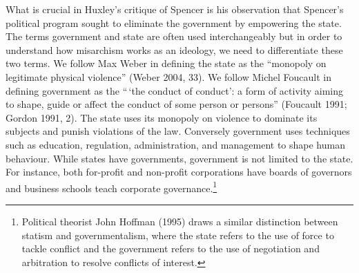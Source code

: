 \documentclass[12pt,]{article}
\begin{document}
What is crucial in Huxley's critique of Spencer is his observation that
Spencer's political program sought to eliminate the government by
empowering the state. The terms government and state are often used
interchangeably but in order to understand how misarchism works as an
ideology, we need to differentiate these two terms. We follow Max Weber
in defining the state as the ``monopoly on legitimate physical
violence'' (Weber 2004, 33). We follow Michel Foucault in defining
government as the ``\,`the conduct of conduct': a form of activity
aiming to shape, guide or affect the conduct of some person or persons''
(Foucault 1991; Gordon 1991, 2). The state uses its monopoly on violence
to dominate its subjects and punish violations of the law. Conversely
government uses techniques such as education, regulation,
administration, and management to shape human behaviour. While states
have governments, government is not limited to the state. For instance,
both for-profit and non-profit corporations have boards of governors and
business schools teach corporate governance.\footnote{Political theorist
  John Hoffman (1995) draws a similar distinction between statism and
  governmentalism, where the state refers to the use of force to tackle
  conflict and the government refers to the use of negotiation and
  arbitration to resolve conflicts of interest.}
\end{document}
